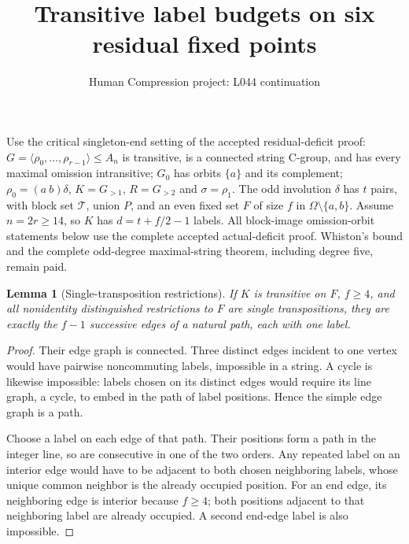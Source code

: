 \documentclass[11pt,a4paper]{article}
\title{Transitive label budgets on six residual fixed points}
\author{Human Compression project: L044 continuation}
\date{}
\newtheorem{lemma}{Lemma}
\newcommand{\gen}[1]{\langle#1\rangle}
\begin{document}
\maketitle
Use the critical singleton-end setting of the accepted residual-deficit
proof: $G=\gen{\rho_0,\ldots,\rho_{r-1}}\leq A_n$ is transitive,
is a connected string C-group, and has every maximal omission intransitive;
$G_0$ has orbits $\{a\}$ and its complement;
$\rho_0=(a\ b)\delta$, $K=G_{>1}$, $R=G_{>2}$ and $\sigma=\rho_1$.
The odd involution $\delta$ has $t$ pairs, with block set $\mathcal T$,
union $P$, and an even
fixed set $F$ of size $f$ in $\Omega\setminus\{a,b\}$.
Assume $n=2r\geq14$, so $K$ has $d=t+f/2-1$ labels.
All block-image omission-orbit statements below use the complete
accepted actual-deficit proof. Whiston's bound and the complete
odd-degree maximal-string theorem, including degree five, remain paid.

\begin{lemma}[Single-transposition restrictions]\label{single}
If $K$ is transitive on $F$, $f\geq4$, and all nonidentity distinguished
restrictions to $F$ are single transpositions, they are exactly the
$f-1$ successive edges of a natural path, each with one label.
\end{lemma}
\begin{proof}
Their edge graph is connected. Three distinct edges incident to one
vertex would have pairwise noncommuting labels, impossible in a string.
A cycle is likewise impossible: labels chosen on its distinct edges
would require its line graph, a cycle, to embed in the path of label
positions. Hence the simple edge graph is a path.

Choose a label on each edge of that path. Their positions form a path
in the integer line, so are consecutive in one of the two orders.
Any repeated label on an interior edge would have to be adjacent to
both chosen neighboring labels, whose unique common neighbor is the
already occupied position. For an end edge, its neighboring edge is
interior because $f\geq4$; both positions adjacent to that neighboring
label are already occupied. A second end-edge label is also impossible.
\end{proof}
\end{document}
